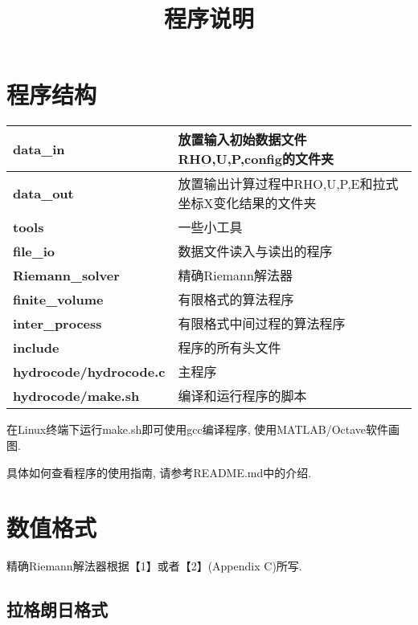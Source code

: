 \documentclass[CJK]{ctexart}
\begin{document}
\title{程序说明}
\date{}
\maketitle


\section{程序结构}

\begin{table}[htbp]
\begin{tabular}{|l|l|}
\hline
\textbf{data\_in}  & 放置输入初始数据文件RHO,U,P,config的文件夹\\
\hline
\textbf{data\_out} & 放置输出计算过程中RHO,U,P,E和拉式坐标X变化结果的文件夹\\
\hline
\textbf{tools}     & 一些小工具\\
\hline
\textbf{file\_io}  & 数据文件读入与读出的程序\\
\hline
\textbf{Riemann\_solver} & 精确Riemann解法器\\
\hline
\textbf{finite\_volume}  & 有限格式的算法程序\\
\hline
\textbf{inter_process}   & 有限格式中间过程的算法程序\\
\hline
\textbf{include}         & 程序的所有头文件\\
\hline
\textbf{hydrocode/hydrocode.c} & 主程序\\
\hline
\textbf{hydrocode/make.sh}     & 编译和运行程序的脚本\\
\hline
\end{tabular}
\end{table}

在Linux终端下运行make.sh即可使用gcc编译程序, 使用MATLAB/Octave软件画图.

具体如何查看程序的使用指南, 请参考README.md中的介绍.


\section{数值格式}

精确Riemann解法器根据【1】或者【2】(Appendix C)所写.

\subsection{拉格朗日格式}
\end{document}
